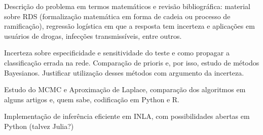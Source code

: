\begin{alineas}
    \item Descrição do problema em termos matemáticos e revisão bibliográfica:
    material sobre RDS (formalização matemática em forma de cadeia ou processo
    de ramificação), regressão logística em que a resposta tem incerteza e
    aplicações em usuários de drogas, infecções transmissíveis, entre outros. 
    \item Incerteza sobre especificidade e sensitividade do teste e como
    propagar a classificação errada na rede. Comparação de prioris e, por isso, estudo de
    métodos Bayesianos. Justificar utilização desses métodos com argumento da
    incerteza. 
    \item Estudo do MCMC e Aproximação de Laplace, comparação dos algoritmos
    em alguns artigos e, quem sabe, codificação em Python e R. 
    \item Implementação de inferência eficiente em INLA, com possibilidades
    abertas em Python (talvez Julia?)
\end{alineas}